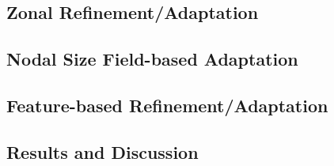 

\subsection{Zonal Refinement/Adaptation}


\subsection{Nodal Size Field-based Adaptation}


\subsection{Feature-based Refinement/Adaptation}

\label{sec:feature_based_strat}


\subsection{Results and Discussion}

\label{sec:results_adapt}
